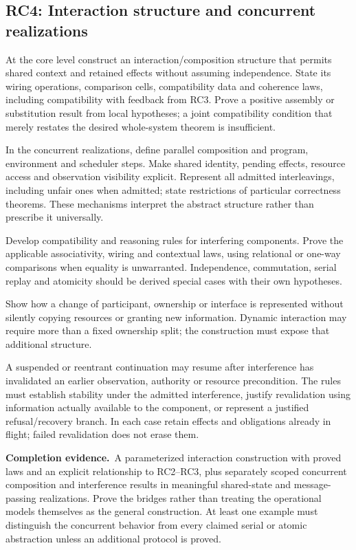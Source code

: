 \documentclass[11pt,a4paper]{article}
\newcommand{\deliver}{\par\textbf{Completion evidence.}\ }
\begin{document}
\subsection*{RC4: Interaction structure and concurrent realizations}\label{rc4}
At the core level construct an interaction/composition structure that permits shared context and retained effects without assuming independence. State its wiring operations, comparison cells, compatibility data and coherence laws, including compatibility with feedback from RC3. Prove a positive assembly or substitution result from local hypotheses; a joint compatibility condition that merely restates the desired whole-system theorem is insufficient.

In the concurrent realizations, define parallel composition and program, environment and scheduler steps. Make shared identity, pending effects, resource access and observation visibility explicit. Represent all admitted interleavings, including unfair ones when admitted; state restrictions of particular correctness theorems. These mechanisms interpret the abstract structure rather than prescribe it universally.

Develop compatibility and reasoning rules for interfering components. Prove the applicable associativity, wiring and contextual laws, using relational or one-way comparisons when equality is unwarranted. Independence, commutation, serial replay and atomicity should be derived special cases with their own hypotheses.

Show how a change of participant, ownership or interface is represented without silently copying resources or granting new information. Dynamic interaction may require more than a fixed ownership split; the construction must expose that additional structure.

A suspended or reentrant continuation may resume after interference has invalidated an earlier observation, authority or resource precondition. The rules must establish stability under the admitted interference, justify revalidation using information actually available to the component, or represent a justified refusal/recovery branch. In each case retain effects and obligations already in flight; failed revalidation does not erase them.

\deliver A parameterized interaction construction with proved laws and an explicit relationship to RC2--RC3, plus separately scoped concurrent composition and interference results in meaningful shared-state and message-passing realizations. Prove the bridges rather than treating the operational models themselves as the general construction. At least one example must distinguish the concurrent behavior from every claimed serial or atomic abstraction unless an additional protocol is proved.
\end{document}
